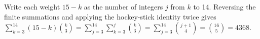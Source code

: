 Write each weight $15-k$ as the number of integers $j$ from $k$ to 14. Reversing the finite summations and applying the hockey-stick identity twice gives $\sum_{k=3}^{14}(15-k)\binom k3=\sum_{j=3}^{14}\sum_{k=3}^j\binom k3=\sum_{j=3}^{14}\binom{j+1}4=\binom{16}5=\boxed{4368}$.
